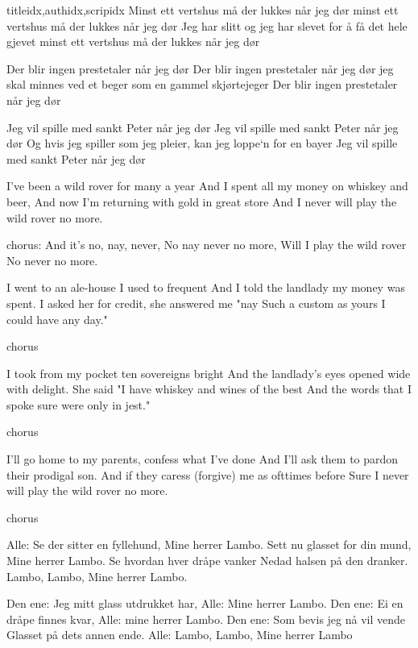 \documentclass[14pt,letterpaper,norsk]{article}
\begin{document}
\begin{songs}{titleidx,authidx,scripidx}
\beginverse
Minst ett vertshus må der lukkes når jeg dør
minst ett vertshus må der lukkes når jeg dør
Jeg har slitt og jeg har slevet for å få det hele gjevet
minst ett vertshus må der lukkes når jeg dør
\endverse

\beginverse
Der blir ingen prestetaler når jeg dør
Der blir ingen prestetaler når jeg dør
jeg skal minnes ved et beger som en gammel skjørtejeger
Der blir ingen prestetaler når jeg dør
\endverse

\beginverse
Jeg vil spille med sankt Peter når jeg dør
Jeg vil spille med sankt Peter når jeg dør
Og hvis jeg spiller som jeg pleier, kan jeg loppe`n for en bayer
Jeg vil spille med sankt Peter når jeg dør
\endverse
\endsong

\beginverse
I've been a wild rover for many a year 
And I spent all my money on whiskey and beer, 
And now I'm returning with gold in great store 
And I never will play the wild rover no more. 
\endverse

\beginchorus
chorus: And it's no, nay, never, 
No nay never no more, 
Will I play the wild rover 
No never no more.
\endchorus

\beginverse
I went to an ale-house I used to frequent 
And I told the landlady my money was spent. 
I asked her for credit, she answered me "nay 
Such a custom as yours I could have any day." 
\endverse

\beginchorus
chorus
\endchorus

\beginverse
I took from my pocket ten sovereigns bright 
And the landlady's eyes opened wide with delight. 
She said "I have whiskey and wines of the best 
And the words that I spoke sure were only in jest." 
\endverse

\beginchorus
chorus 
\endchorus

\beginverse
I'll go home to my parents, confess what I've done 
And I'll ask them to pardon their prodigal son. 
And if they caress (forgive) me as ofttimes before 
Sure I never will play the wild rover no more. 
\endverse

\beginchorus
chorus
\endchorus
\endsong

\beginverse
Alle: Se der sitter en fyllehund,
Mine herrer Lambo.
Sett nu glasset for din mund,
Mine herrer Lambo.
Se hvordan hver dråpe vanker
Nedad halsen på den dranker.
Lambo, Lambo,
Mine herrer Lambo.
\endverse

\beginverse
Den ene: Jeg mitt glass utdrukket har,
Alle: Mine herrer Lambo.
Den ene: Ei en dråpe finnes kvar,
Alle: mine herrer Lambo.
Den ene: Som bevis jeg nå vil vende
Glasset på dets annen ende.
Alle: Lambo, Lambo,
Mine herrer Lambo
\endverse


\end{songs}
\end{document}
